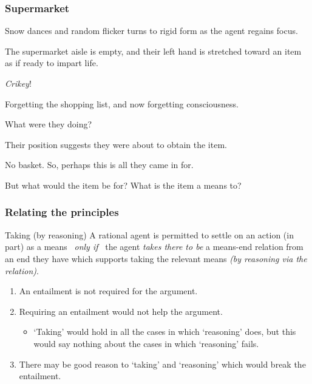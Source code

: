 \documentclass[noamssymb,
]{beamer} %
\begin{document}
\begin{frame}
  \frametitle{Supermarket}

  {\rmfamily

    Snow dances and random flicker turns to rigid form as the agent regains focus.

    The supermarket aisle is empty, and their left hand is stretched toward an item as if ready to impart life.

    \emph{Crikey}!

    Forgetting the shopping list, and now forgetting consciousness.

    What were they doing?

    Their position suggests they were about to obtain the item.

    No basket. So, perhaps this is all they came in for.

    But what would the item be for?  What is the item a means to?

  }
\end{frame}


\begin{frame}
  \frametitle{Relating the principles}

  \begin{block}{Taking (by reasoning)}
    A rational agent is permitted to settle on an action (in part) as a means
    \newline
    \mbox{ }\hfill\emph{only if}\hfill\mbox{ }
    \newline
    the agent \emph{takes there to be}  a means-end relation from an end they have which supports taking the relevant means \emph{(by reasoning via the relation)}.
  \end{block}

  \begin{enumerate}
  \item An entailment is not required for the argument.
  \item Requiring an entailment would not help the argument.
    \begin{itemize}
    \item `Taking' would hold in all the cases in which `reasoning' does, but this would say nothing about the cases in which `reasoning' fails.
    \end{itemize}
  \item There may be good reason to `taking' and `reasoning' which would break the entailment.
  \end{enumerate}
\end{frame}
\end{document}
